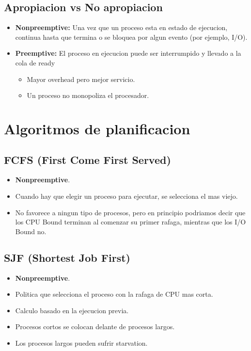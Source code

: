 \documentclass[11pt]{article}
\begin{document}
\subsection{Apropiacion vs No apropiacion}
\begin{itemize}
    \item \textbf{Nonpreemptive:} Una vez que un proceso esta en estado de ejecucion, continua hasta que termina o se bloquea por algun evento (por ejemplo, I/O).
    \item \textbf{Preemptive:} El proceso en ejecucion puede ser interrumpido y llevado a la cola de ready
        \begin{itemize}
            \item Mayor overhead pero mejor servicio.
            \item Un proceso no monopoliza el procesador.
        \end{itemize}
\end{itemize}

\section{Algoritmos de planificacion}

\subsection{FCFS (First Come First Served)}
\begin{itemize}
    \item \textbf{Nonpreemptive}.
    \item Cuando hay que elegir un proceso para ejecutar, se selecciona el mas viejo.
    \item No favorece a ningun tipo de procesos, pero en principio podriamos decir que los CPU Bound terminan al comenzar su primer rafaga, mientras que los I/O Bound no.
\end{itemize}

\subsection{SJF (Shortest Job First)}
\begin{itemize}
    \item \textbf{Nonpreemptive}.
    \item Politica que selecciona el proceso con la rafaga de CPU mas corta.
    \item Calculo basado en la ejecucion previa.
    \item Procesos cortos se colocan delante de procesos largos.
    \item Los procesos largos pueden sufrir starvation.
\end{itemize}
\end{document}
